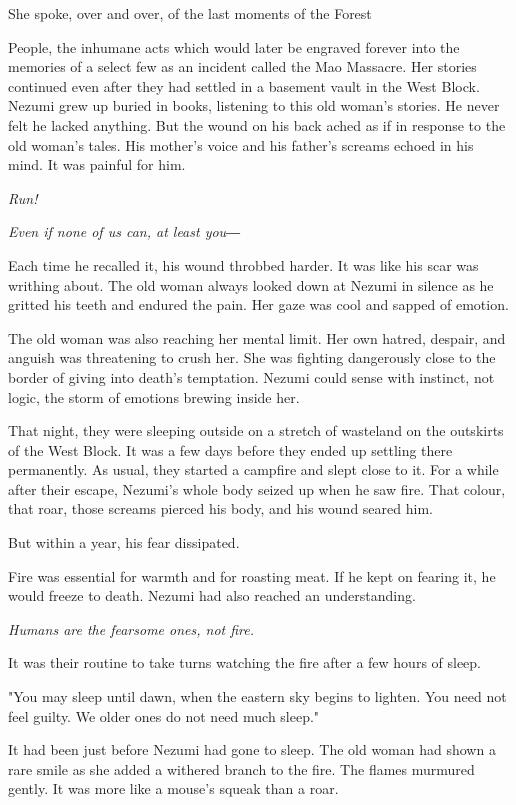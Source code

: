She spoke, over and over, of the last moments of the Forest~

People, the inhumane acts which would later be engraved forever into the
memories of a select few as an incident called the Mao Massacre. Her
stories continued even after they had settled in a basement vault in the
West Block. Nezumi grew up buried in books, listening to this old
woman's stories. He never felt he lacked anything. But the wound on his
back ached as if in response to the old woman's tales. His mother's
voice and his father's screams echoed in his mind. It was painful for
him.

\emph{Run!}

\emph{Even if none of us can, at least you―}

Each time he recalled it, his wound throbbed harder. It was like his
scar was writhing about. The old woman always looked down at Nezumi in
silence as he gritted his teeth and endured the pain. Her gaze was cool
and sapped of emotion.

The old woman was also reaching her mental limit. Her own hatred,
despair, and anguish was threatening to crush her. She was fighting
dangerously close to the border of giving into death's temptation.
Nezumi could sense with instinct, not logic, the storm of emotions
brewing inside her.

That night, they were sleeping outside on a stretch of wasteland on the
outskirts of the West Block. It was a few days before they ended up
settling there permanently. As usual, they started a campfire and slept
close to it. For a while after their escape, Nezumi's whole body seized
up when he saw fire. That colour, that roar, those screams pierced his
body, and his wound seared him.

But within a year, his fear dissipated.

Fire was essential for warmth and for roasting meat. If he kept on
fearing it, he would freeze to death. Nezumi had also reached an
understanding.

\emph{Humans are the fearsome ones, not fire.}

It was their routine to take turns watching the fire after a few hours
of sleep.

"You may sleep until dawn, when the eastern sky begins to lighten. You
need not feel guilty. We older ones do not need much sleep."

It had been just before Nezumi had gone to sleep. The old woman had
shown a rare smile as she added a withered branch to the fire. The
flames murmured gently. It was more like a mouse's squeak than a roar.

